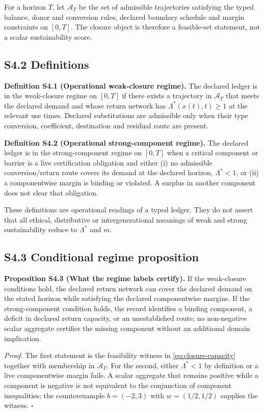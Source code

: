 \documentclass[11pt]{article}
\begin{document}
For a horizon $T$, let $\mathcal A_T$ be the set of admissible trajectories satisfying the typed balance, donor and conversion rules, declared boundary schedule and margin constraints on $[0,T]$. The closure object is therefore a feasible-set statement, not a scalar sustainability score.

\subsection*{S4.2 Definitions}

\textbf{Definition S4.1 (Operational weak-closure regime).} The declared ledger is in the weak-closure regime on $[0,T]$ if there exists a trajectory in $\mathcal A_T$ that meets the declared demand and whose return network has $\Lambda^*(x(t),t)\geq1$ at the relevant use times. Declared substitutions are admissible only when their type conversion, coefficient, destination and residual route are present.

\textbf{Definition S4.2 (Operational strong-component regime).} The declared ledger is in the strong-component regime on $[0,T]$ when a critical component or barrier is a live certification obligation and either (i) no admissible conversion/return route covers its demand at the declared horizon, $\Lambda^*<1$, or (ii) a componentwise margin is binding or violated. A surplus in another component does not clear that obligation.

These definitions are operational readings of a typed ledger. They do not assert that all ethical, distributive or intergenerational meanings of weak and strong sustainability reduce to $\Lambda^*$ and $m$.

\subsection*{S4.3 Conditional regime proposition}

\textbf{Proposition S4.3 (What the regime labels certify).} If the weak-closure conditions hold, the declared return network can cover the declared demand on the stated horizon while satisfying the declared componentwise margins. If the strong-component condition holds, the record identifies a binding component, a deficit in declared return capacity, or an unestablished route; no non-negative scalar aggregate certifies the missing component without an additional domain implication.

\emph{Proof.} The first statement is the feasibility witness in \eqref{eq:closure-capacity} together with membership in $\mathcal A_T$. For the second, either $\Lambda^*<1$ by definition or a live componentwise margin fails. A scalar aggregate that remains positive while a component is negative is not equivalent to the conjunction of component inequalities; the counterexample $b=(-2,3)$ with $w=(1/2,1/2)$ supplies the witness. \(\square\)
\end{document}
